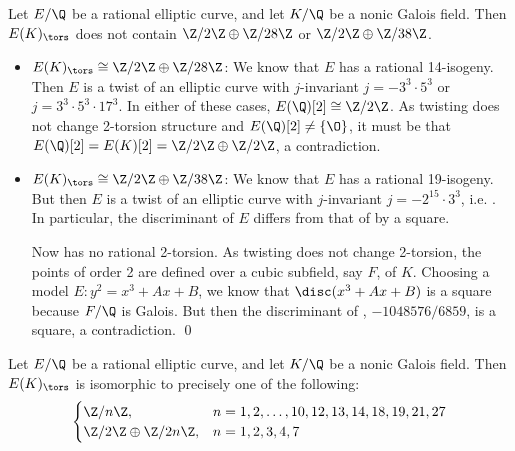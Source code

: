\begin{frame}[plain]
\footnotesize
\begin{lem}
Let $E/\Q$ be a rational elliptic curve, and let $K/\Q$ be a nonic Galois field. Then $E(K)_\tors$ does not contain $\Z/2\Z \oplus \Z/28\Z$ or $\Z/2\Z \oplus \Z/38\Z$.
\end{lem}

\pf 
\begin{itemize}
\item $E(K)_\tors \cong \Z/2\Z \oplus \Z/28\Z$: We know that $E$ has a rational 14-isogeny. Then $E$ is a twist of an elliptic curve with $j$-invariant $j= -3^3 \cdot 5^3$ or $j= 3^3 \cdot 5^3 \cdot 17^3$. In either of these cases, $E(\Q)[2] \cong \Z/2\Z$. As twisting does not change 2-torsion structure and $E(\Q)[2] \neq \{ \O \}$, it must be that $E(\Q)[2]= E(K)[2]= \Z/2\Z \oplus \Z/2\Z$, a contradiction. \pspace

\item $E(K)_\tors \cong \Z/2\Z \oplus \Z/38\Z$: We know that $E$ has a rational 19-isogeny. But then $E$ is a twist of an elliptic curve with $j$-invariant $j= -2^{15} \cdot 3^3$, i.e. \tsoao{}. In particular, the discriminant of $E$ differs from that of \tsoao{} by a square. \par\vspace{0.3cm}

Now \tsoao{} has no rational 2-torsion. As twisting does not change 2-torsion, the points of order 2 are defined over a cubic subfield, say $F$, of $K$. Choosing a model $E: y^2= x^3 + Ax + B$, we know that $\disc(x^3 + Ax + B)$ is a square because $F/\Q$ is Galois. But then the discriminant of \tsoao{}, $-1048576/6859$, is a square, a contradiction. \hfill\qed
\end{itemize}
\end{frame}





\begin{frame}[plain]
\begin{thm} 
Let $E/\Q$ be a rational elliptic curve, and let $K/\Q$ be a nonic Galois field. Then $E(K)_\tors$ is isomorphic to precisely one of the following:
	\[
	\begin{cases}
	\Z/n\Z, & n= 1, 2, \ldots, 10, 12, 13, 14, 18, 19, 21, 27 \\
	\Z/2\Z \oplus \Z/2n\Z, & n= 1, 2, 3, 4, 7
	\end{cases}
	\]
\end{thm}
\end{frame}





